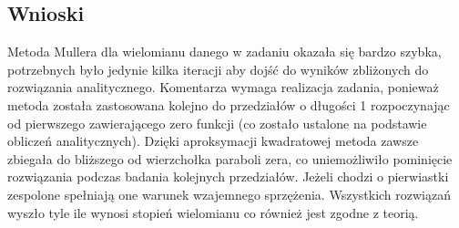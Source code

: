\documentclass[a4paper, 11pt]{article}
\begin{document}
\subsection{Wnioski}
Metoda Mullera dla wielomianu danego w zadaniu okazała się bardzo szybka, potrzebnych było jedynie kilka iteracji aby dojść do wyników zbliżonych do rozwiązania analitycznego. Komentarza wymaga realizacja zadania, ponieważ metoda została zastosowana kolejno do przedziałów o długości 1 rozpoczynając od pierwszego zawierającego zero funkcji (co zostało ustalone na podstawie obliczeń analitycznych). Dzięki aproksymacji kwadratowej metoda zawsze zbiegała do bliższego od wierzchołka paraboli zera, co uniemożliwiło pominięcie rozwiązania podczas badania kolejnych przedziałów. Jeżeli chodzi o pierwiastki zespolone spełniają one warunek wzajemnego sprzężenia. Wszystkich rozwiązań wyszło tyle ile wynosi stopień wielomianu co również jest zgodne z teorią. 
	
\end{document}

